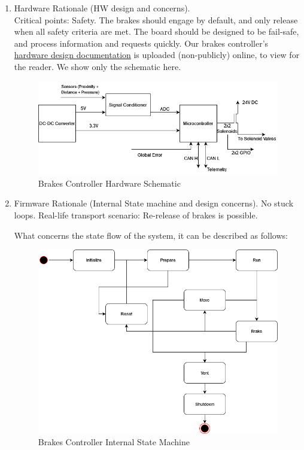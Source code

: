 \begin{enumerate}
\begin{enumerate}
        \item Hardware Rationale (HW design and concerns). \\
        Critical points: Safety. The brakes should engage by default, and only release when all safety criteria are met. The board should be designed to be fail-safe, and process information and requests quickly.
        Our brakes controller's \href{https://drive.google.com/file/d/1a7zaJbmfFdLdrrGtLt2_ySVTqbc168NL/}{hardware design documentation} is uploaded (non-publicly) online, to view for the reader. We show only the schematic here. 
        \begin{figure}[H]
            \centering
            \includegraphics[width=0.7\linewidth]{texfiles/elec/eimg/Brakesystems}
            \caption{Brakes Controller Hardware Schematic}
            \label{fig:Brakes Controller Hardware Schematic}
        \end{figure}


        \item Firmware Rationale (Internal State machine and design concerns).
        No stuck loops. Real-life transport scenario: Re-release of brakes is possible. 


        What concerns the state flow of the system, it can be described as follows:
        \begin{figure}[H]
            \centering
            \includegraphics[width=0.6\linewidth]{texfiles/elec/eimg/BrakesStatechart.png}
            \caption{Brakes Controller Internal State Machine}
            \label{fig:Brakes stateflow}
        \end{figure}


\end{enumerate}
\end{enumerate}
